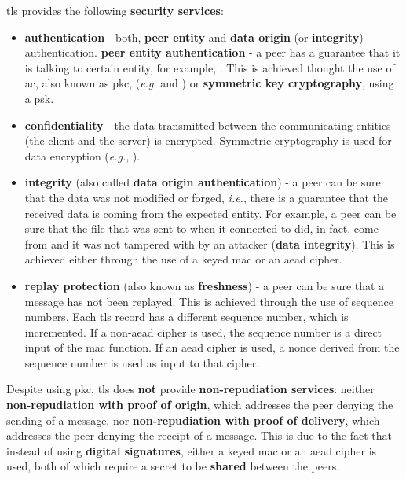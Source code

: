 \documentclass{llncs}
\begin{document}
\gls{tls} provides the following \textbf{security services}:
\begin{itemize}
\item \textbf{authentication} - both, \textbf{peer entity} and \textbf{data origin} (or \textbf{integrity})
authentication.
\subitem \textbf{peer entity authentication} - a peer has a guarantee that it is talking to certain entity, for example, .
This is achieved thought the use of \gls{ac}, also known as \gls{pkc}, (\textit{e.g.}  and )
or \textbf{symmetric key cryptography}, using a \gls{psk}.
\item \textbf{confidentiality} - the data transmitted between the communicating
entities (the client and the server) is encrypted. Symmetric cryptography is
used for data encryption (\textit{e.g.}, ).
\item \textbf{integrity} (also called \textbf{data origin authentication}) - a peer can be sure that the data was not modified or forged,
\textit{i.e.}, there is a guarantee that the received data is coming from the expected entity. For example, a peer can be sure
that the  file that was sent to when it connected to  did, in fact,
come from  and it was not tampered with by an attacker (\textbf{data integrity}). This is achieved either through the use
of a keyed \gls{mac} or an \gls{aead} cipher.
\item \textbf{replay protection} (also known as \textbf{freshness}) -
a peer can be sure that a message has not been replayed. This is
achieved through the use of sequence numbers. Each \gls{tls} record has a different sequence number, which is incremented. If a non-\gls{aead} cipher is used, the sequence number is a direct input of the \gls{mac} function. If an \gls{aead} cipher is used, a nonce derived from the sequence number is used as input to that cipher.
\end{itemize}

Despite using \gls{pkc}, \gls{tls} does \textbf{not} provide \textbf{non-repudiation services}:
neither \textbf{non-repudiation with proof of origin}, which addresses the peer denying
the sending of a message, nor \textbf{non-repudiation with proof of delivery}, which
addresses the peer denying the receipt of a message. This is due to the fact that
instead of using \textbf{digital signatures}, either a keyed \gls{mac} or an \gls{aead}
cipher is used, both of which require a secret to be \textbf{shared} between the peers.
\end{document}

